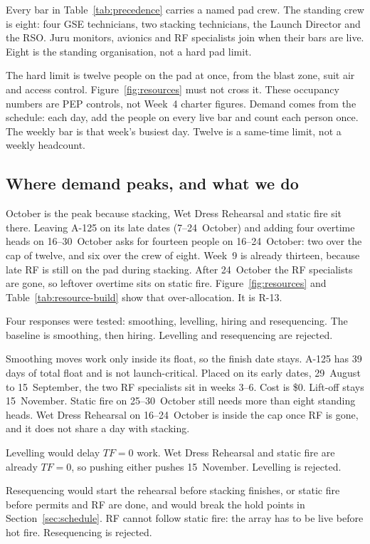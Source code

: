 Every bar in Table~\ref{tab:precedence} carries a named pad crew. The standing crew is eight: four GSE technicians, two stacking technicians, the Launch Director and the RSO. Juru monitors, avionics and RF specialists join when their bars are live. Eight is the standing organisation, not a hard pad limit.

The hard limit is twelve people on the pad at once, from the blast zone, suit air and access control. Figure~\ref{fig:resources} must not cross it. These occupancy numbers are PEP controls, not Week~4 charter figures. Demand comes from the schedule: each day, add the people on every live bar and count each person once. The weekly bar is that week's busiest day. Twelve is a same-time limit, not a weekly headcount.

\subsection{Where demand peaks, and what we do}

October is the peak because stacking, Wet Dress Rehearsal and static fire sit there. Leaving A-125 on its late dates (7--24~October) and adding four overtime heads on 16--30~October asks for fourteen people on 16--24~October: two over the cap of twelve, and six over the crew of eight. Week~9 is already thirteen, because late RF is still on the pad during stacking. After 24~October the RF specialists are gone, so leftover overtime sits on static fire. Figure~\ref{fig:resources} and Table~\ref{tab:resource-build} show that over-allocation. It is R-13.

Four responses were tested: smoothing, levelling, hiring and resequencing. The baseline is smoothing, then hiring. Levelling and resequencing are rejected.

Smoothing moves work only inside its float, so the finish date stays. A-125 has 39 days of total float and is not launch-critical. Placed on its early dates, 29~August to 15~September, the two RF specialists sit in weeks 3--6. Cost is \$0. Lift-off stays 15~November. Static fire on 25--30~October still needs more than eight standing heads. Wet Dress Rehearsal on 16--24~October is inside the cap once RF is gone, and it does not share a day with stacking.

Levelling would delay $TF = 0$ work. Wet Dress Rehearsal and static fire are already $TF = 0$, so pushing either pushes 15~November. Levelling is rejected.

Resequencing would start the rehearsal before stacking finishes, or static fire before permits and RF are done, and would break the hold points in Section~\ref{sec:schedule}. RF cannot follow static fire: the array has to be live before hot fire. Resequencing is rejected.

